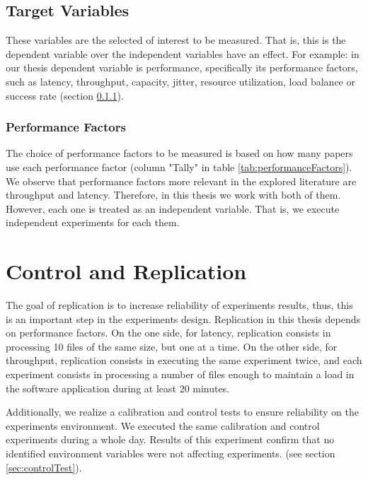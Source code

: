 \subsection{Target Variables}
These variables are the selected of interest to be measured. That is, this is the dependent variable over the independent variables have an effect. For example: in our thesis dependent variable is performance, specifically its performance factors, such as latency, throughput, capacity, jitter, resource utilization, load balance or success rate (section \ref{subsubsec:performanceFactors}).

\subsubsection{Performance Factors}
\label{subsubsec:performanceFactors}
The choice of performance factors to be measured is based on how many papers use each performance factor (column "Tally" in table \ref{tab:performanceFactors}). We observe that performance factors more relevant in the explored literature are throughput and latency. Therefore, in this thesis we work with both of them. However, each one is treated as an independent variable. That is, we execute independent experiments for each them.

\section{Control and Replication}
\label{sec:controlandrep}
The goal of replication is to increase reliability of experiments results, thus, this is an important step in the experiments design. Replication in this thesis depends on performance factors. On the one side, for latency, replication consists in processing 10 files of the same size, but one at a time. On the other side, for throughput, replication consists in executing the same experiment twice, and each experiment consists in processing a number of files enough to maintain a load in the software application during at least 20 minutes.

Additionally, we realize a calibration and control tests to ensure reliability on the experiments environment. We executed the same calibration and control experiments during a whole day. Results of this experiment confirm that no identified environment variables were not affecting experiments. (see section \ref{sec:controlTest}).

